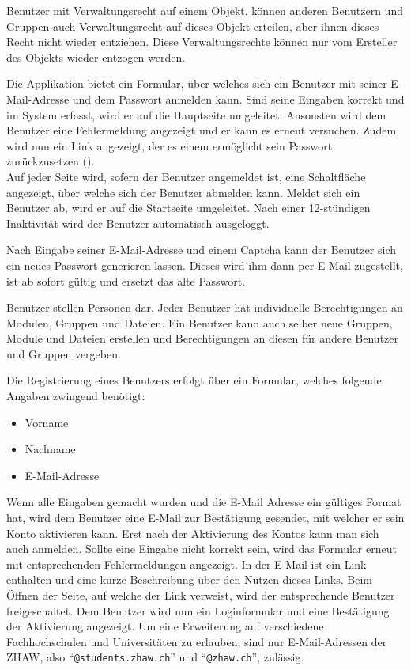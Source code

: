 Benutzer mit Verwaltungsrecht auf einem Objekt, können anderen Benutzern und Gruppen auch Verwaltungsrecht auf dieses Objekt erteilen, aber ihnen dieses Recht nicht wieder entziehen. Diese Verwaltungsrechte können nur vom Ersteller des Objekts wieder entzogen werden.


Die Applikation bietet ein Formular, über welches sich ein Benutzer mit seiner E-Mail-Adresse und dem Passwort anmelden kann. Sind seine Eingaben korrekt und im System erfasst, wird er auf die Hauptseite umgeleitet. Ansonsten  wird dem Benutzer eine Fehlermeldung angezeigt und er kann es erneut versuchen. Zudem wird nun ein Link angezeigt, der es einem ermöglicht sein Passwort zurückzusetzen ().\\

Auf jeder Seite wird, sofern der Benutzer angemeldet ist, eine Schaltfläche angezeigt, über welche sich der Benutzer abmelden kann. Meldet sich ein Benutzer ab, wird er auf die Startseite umgeleitet. Nach einer 12-stündigen Inaktivität wird der Benutzer automatisch ausgeloggt.

Nach Eingabe seiner E-Mail-Adresse und einem \gls{Captcha} kann der Benutzer sich ein neues Passwort generieren lassen. Dieses wird ihm dann per E-Mail zugestellt, ist ab sofort gültig und ersetzt das alte Passwort.

Benutzer stellen Personen dar. Jeder Benutzer hat individuelle Berechtigungen an Modulen, Gruppen und Dateien. Ein Benutzer kann auch selber neue Gruppen, Module und Dateien erstellen und Berechtigungen an diesen für andere Benutzer und Gruppen vergeben.

Die Registrierung eines Benutzers erfolgt über ein Formular, welches folgende Angaben zwingend benötigt:
\begin{itemize}
\item Vorname
\item Nachname
\item E-Mail-Adresse
\end{itemize}
Wenn alle Eingaben gemacht wurden und die E-Mail Adresse ein gültiges Format hat, wird dem Benutzer eine E-Mail zur Bestätigung gesendet, mit welcher er sein Konto aktivieren kann. Erst nach der Aktivierung des Kontos kann man sich auch anmelden. Sollte eine Eingabe nicht korrekt sein, wird das Formular erneut mit entsprechenden Fehlermeldungen angezeigt. In der E-Mail ist ein Link enthalten und eine kurze Beschreibung über den Nutzen dieses Links. Beim Öffnen der Seite, auf welche der Link verweist, wird der entsprechende Benutzer freigeschaltet. Dem Benutzer wird nun ein Loginformular und eine Bestätigung der Aktivierung angezeigt.
Um eine Erweiterung auf verschiedene Fachhochschulen und Universitäten zu erlauben, sind nur E-Mail-Adressen der ZHAW, also "`\texttt{@students.zhaw.ch}"' und "`\texttt{@zhaw.ch}"', zulässig.

